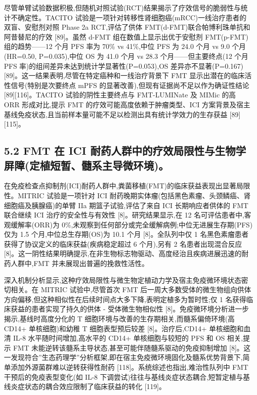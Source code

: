 尽管单臂试验数据积极,但随机对照试验(RCT)结果揭示了疗效信号的脆弱性与统计不确定性。TACITO 试验是一项针对转移性肾细胞癌(mRCC)一线治疗患者的双盲、安慰剂对照 Phase 2a RCT,评估了供体 FMT(d-FMT)联合帕博利珠单抗和阿昔替尼的疗效 {[}89{]}。虽然 d-FMT 组在数值上显示出优于安慰剂 FMT(p-FMT)组的趋势------12 个月 PFS 率为 70\% vs 41\%,中位 PFS 为 24.0 个月 vs 9.0 个月(HR=0.50, P=0.035),中位 OS 为 41.0 个月 vs 28.3 个月------但主要终点(12 个月 PFS 率)的组间差异未达到统计学显著性(P=0.053),OS 差异亦不显著(P=0.167){[}89{]}。这一结果表明,尽管在特定癌种和一线治疗背景下 FMT 显示出潜在的临床活性信号(特别是次要终点 mPFS 的显著改善),但现有证据尚不足以作为确证性结论 {[}89{]}{[}116{]}。TACITO 试验的阴性主要终点与 FMT-LUMINate 及 MIMic 的高 ORR 形成对比,提示 FMT 的疗效可能高度依赖于肿瘤类型、ICI 方案背景及宿主基线免疫状态,且当前样本量可能不足以检测出具有统计学效力的生存获益 {[}89{]}{[}115{]}。

\subsection{5.2 FMT 在 ICI 耐药人群中的疗效局限性与生物学屏障(定植短暂、髓系主导微环境)。}\label{fmt-ux5728-ici-ux8010ux836fux4ebaux7fa4ux4e2dux7684ux7597ux6548ux5c40ux9650ux6027ux4e0eux751fux7269ux5b66ux5c4fux969cux5b9aux690dux77edux6682ux9ad3ux7cfbux4e3bux5bfcux5faeux73afux5883}

在免疫检查点抑制剂(ICI)耐药人群中,粪菌移植(FMT)的临床获益表现出显著局限性。MITRIC 试验是一项针对 ICI 耐药晚期实体瘤(包括黑色素瘤、头颈鳞癌、肾细胞癌及胰腺癌)的单臂 IIa 期篮子试验,评估了来自 ICI 长期响应者供体的 FMT 联合继续 ICI 治疗的安全性与有效性 {[}8{]}。研究结果显示,在 12 名可评估患者中,客观缓解率(ORR)为 0\%,未观察到任何部分或完全缓解病例;中位无进展生存期(PFS)仅为 1.5 个月,中位总生存期(OS)为 10.1 个月 {[}8{]}。全队列中仅 1 名黑色素瘤患者获得了协议定义的临床获益(疾病稳定超过 6 个月),另有 2 名患者出现混合反应 {[}8{]}。这一阴性结果明确提示,在非生物标志物驱动、高度经治且疾病进展迅速的耐药人群中,FMT 并未展现出普遍的挽救性活性。

深入机制分析显示,这种疗效局限性与微生物定植动力学及宿主免疫微环境状态密切相关。在 MITRIC 试验中,尽管首次 FMT 后一周大多数受体的微生物组向供体方向偏移,但这种相似性在后续时间点大多下降,表明定植多为暂时性;仅 1 名获得临床获益的患者实现了持久的供体 - 受体微生物相似性 {[}8{]}。免疫微环境分析进一步揭示,基线时高度分化的 T 细胞环境与改善的生存期相关,而髓系偏倚环境(高 CD14+ 单核细胞)和幼稚 T 细胞表型预后较差 {[}8{]}。治疗后,CD14+ 单核细胞和血清 IL-8 水平随时间增加,高水平的 CD14+ 单核细胞与较短的 PFS 和 OS 相关,提示 FMT 未能逆转该髓系主导状态,甚至可能伴随髓系驱动的免疫抑制增加 {[}8{]}。这一发现符合''生态药理学''分析框架,即在宿主免疫微环境固化及髓系优势背景下,简单添加外源菌群难以逆转获得性耐药 {[}118{]}。系统综述也指出,难治性队列中 FMT 干预后的免疫表型变化(如 IL-8 下调尝试)往往与基线炎症状态耦合,短暂定植与基线炎症状态的耦合效应限制了临床获益的转化 {[}119{]}。

